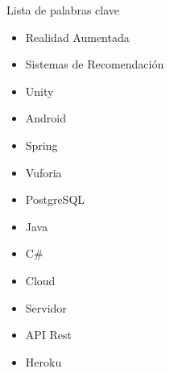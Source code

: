    \vspace{0.5cm}
   
   Lista de palabras clave
   \begin{itemize}  
    \item Realidad Aumentada
    \item Sistemas de Recomendación
    \item Unity
    \item Android
    \item Spring
    \item Vuforia
    \item PostgreSQL
    \item Java
    \item C\#
    \item Cloud
    \item Servidor
    \item API Rest
    \item Heroku
  \end{itemize}
   


